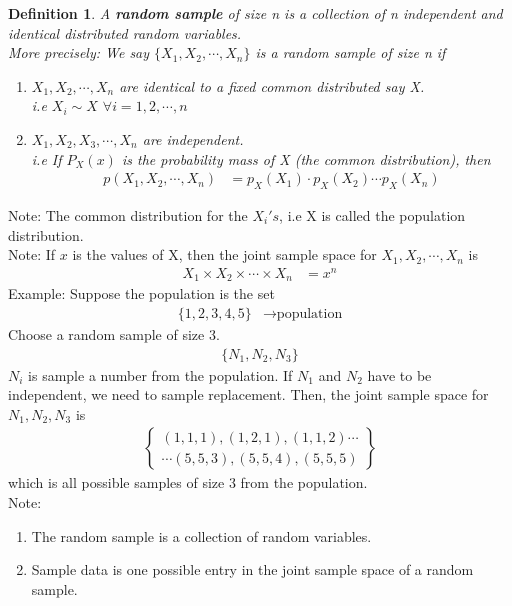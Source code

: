 \documentclass[11pt,oneside]{book}
\theoremstyle{break}
\theoremstyle{break}
\newtheorem{defn}{Definition}[corL]
\newcommand{\note}{\color{Purple}Note: \color{black}}
\newcommand{\example}{\color{WildStrawberry}Example: \color{black}}
\begin{document}
\begin{defn}
A \textbf{random sample} of size n is a collection of n independent and identical distributed random variables.\\
More precisely: We say $\{X_1,X_2,\cdots ,X_n\}$ is a random sample of size n if \begin{enumerate}
\item $X_1,X_2,\cdots,X_n$ are identical to a fixed common distributed say X. \\
 i.e $X_i\sim X$ $\forall i=1,2,\cdots,n$
\item $X_1,X_2,X_3,\cdots,X_n$ are independent. \\
i.e If $P_X(x)$ is the probability mass of X (the common distribution), then \begin{align*}
p\left(X_1,X_2,\cdots,X_n\right)&=p_X(X_1)\cdot p_X(X_2) \cdots p_X(X_n)
\end{align*}
\end{enumerate}
\end{defn}
\note The common distribution for the $X_i's$, i.e X is called the population distribution.\\ 
\note If $x$ is the values of X, then the joint sample space for $X_1,X_2,\cdots,X_n$ is \begin{align*}
X_1\times X_2\times \cdots \times X_n&=x^n
\end{align*}
\example Suppose the population is the set \begin{align*}
\{1,2,3,4,5\}&\longrightarrow \text{population}
\end{align*}
Choose a random sample of size 3. \begin{align*}
\{N_1,N_2,N_3\}
\end{align*}
$N_i$ is sample a number from the population. If $N_1$ and $N_2$ have to be independent, we need to sample replacement. Then, the joint sample space for $N_1,N_2,N_3$ is \begin{align*}
\begin{Bmatrix}
(1,1,1),(1,2,1),(1,1,2)\cdots\\
\cdots (5,5,3),(5,5,4),(5,5,5)
\end{Bmatrix}
\end{align*}
which is all possible samples of size 3 from the population.\\
\note \begin{enumerate}[topsep=0pt,itemsep=-1ex,partopsep=1ex,parsep=1ex]
\item The random sample is a collection of random variables.
\item Sample data is one possible entry in the joint sample space of a random sample.
\end{enumerate}
\end{document}
